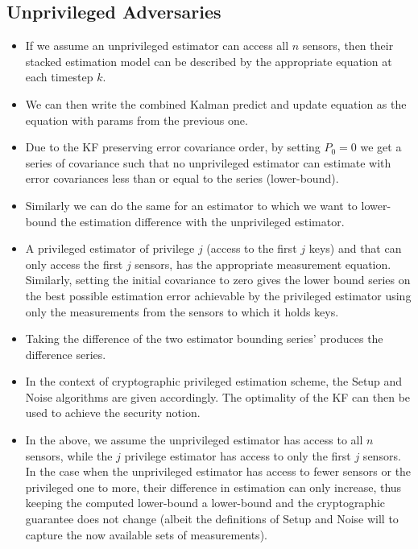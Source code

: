 \documentclass[conference]{IEEEtran}
\begin{document}
\subsection{Unprivileged Adversaries}
\begin{itemize}
  \item If we assume an unprivileged estimator can access all $n$ sensors, then their stacked estimation model can be described by the appropriate equation at each timestep $k$. 
  \item We can then write the combined Kalman predict and update equation as the equation with params from the previous one.
  \item Due to the KF preserving error covariance order, by setting $P_0=0$ we get a series of covariance such that no unprivileged estimator can estimate with error covariances less than or equal to the series (lower-bound).
  \item Similarly we can do the same for an estimator to which we want to lower-bound the estimation difference with the unprivileged estimator. 
  \item A privileged estimator of privilege $j$ (access to the first $j$ keys) and that can only access the first $j$ sensors, has the appropriate measurement equation. Similarly, setting the initial covariance to zero gives the lower bound series on the best possible estimation error achievable by the privileged estimator using only the measurements from the sensors to which it holds keys.
  \item Taking the difference of the two estimator bounding series' produces the difference series.
  \item In the context of cryptographic privileged estimation scheme, the Setup and Noise algorithms are given accordingly. The optimality of the KF can then be used to achieve the security notion.
  \item In the above, we assume the unprivileged estimator has access to all $n$ sensors, while the $j$ privilege estimator has access to only the first $j$ sensors. In the case when the unprivileged estimator has access to fewer sensors or the privileged one to more, their difference in estimation can only increase, thus keeping the computed lower-bound a lower-bound and the cryptographic guarantee does not change (albeit the definitions of Setup and Noise will to capture the now available sets of measurements).
\end{itemize}
\end{document}
